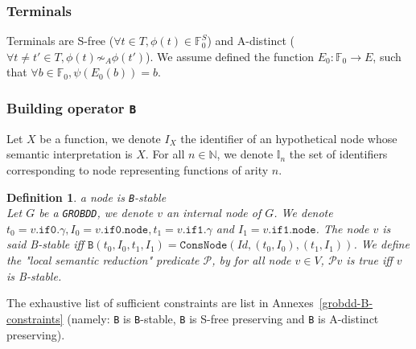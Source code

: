 \documentclass[a4paper,10pt]{article}
\newcommand{\N}{\mathbb{N}}%
\newcommand{\F}{\mathbb{F}}
\newcommand{\I}{\mathbb{I}}
\newcommand{\GroBdd}{\texttt{GROBDD}}
\newcommand{\fieldNode}{\texttt{node}}
\newcommand{\fieldGamma}{\mathtt{\gamma}}
\newcommand{\fieldThen}{\mathtt{if1}}
\newcommand{\fieldElse}{\mathtt{if0}}
\newtheorem{newdef}{Definition}
\newcommand{\definition}[2]{\begin{newdef}{#1\\}#2\end{newdef}}
\begin{document}
\subsubsection{Terminals}
Terminals are S-free ($\forall t\in T, \phi(t)\in\F^S_0$) and A-distinct ($\forall t\neq t'\in T, \phi(t) \not\sim_A \phi(t')$).
We assume defined the function $E_0: \F_0 \longrightarrow E$, such that $\forall b\in\F_0, \psi(E_0(b)) = b$. 


\subsubsection{Building operator \texttt{B}}

Let $X$ be a function, we denote $I_X$ the identifier of an hypothetical node whose semantic interpretation is $X$.
For all $n\in\N$, we denote $\I_n$ the set of identifiers corresponding to node representing functions of arity $n$.

\definition{a node is \texttt{B}-stable}
{
Let $G$ be a \GroBdd{}, we denote $v$ an internal node of $G$.
We denote $t_0 = v.\fieldElse{}.\fieldGamma{}, I_0 = v.\fieldElse{}.\fieldNode{}, t_1 = v.\fieldThen{}.\fieldGamma{}$ and $I_1 = v.\fieldThen{}.\fieldNode{}$.
The node $v$ is said B-stable iff $\mathtt{B}(t_0, I_0, t_1, I_1) = \mathtt{ConsNode}(Id, (t_0, I_0), (t_1, I_1))$.
We define the "local semantic reduction" predicate $\mathcal{P}$, by for all node $v\in V$, $\mathcal{P} v$ is true iff $v$ is B-stable.
}

The exhaustive list of sufficient constraints are list in Annexes~\ref{grobdd-B-constraints} (namely: \texttt{B} is \texttt{B}-stable, \texttt{B} is S-free preserving and \texttt{B} is A-distinct preserving).
\end{document}
